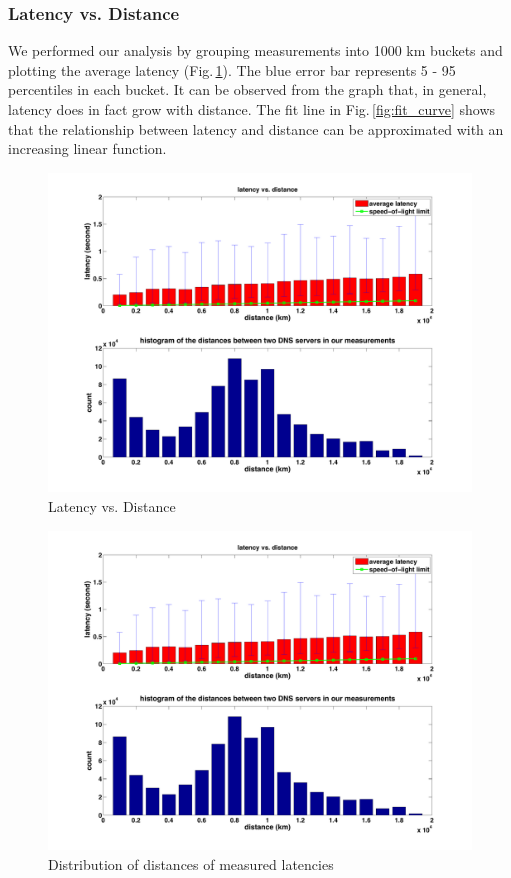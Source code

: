 \subsubsection{Latency vs. Distance}
We performed our analysis by grouping measurements into 1000 km buckets and plotting the average latency (Fig.\,\ref{fig:latency_dist}). The blue error bar represents 5 - 95 percentiles in each bucket. It can be observed from the graph that, in general, latency does in fact grow with distance. The fit line in Fig.\,\ref{fig:fit_curve} shows that the relationship between latency and distance can be approximated with an increasing linear function.

\begin{figure}
  \centering
  \includegraphics[width=\linewidth]{../figs/King_latency_dist.pdf}
  \caption{Latency vs. Distance}
  \label{fig:latency_dist}
\end{figure}

\begin{figure}
  \centering
  \includegraphics[width=\linewidth]{../figs/King_distance_distrbution.pdf}
  \caption{Distribution of distances of measured latencies}
  \label{fig:latency_distance_distribution}
\end{figure}

